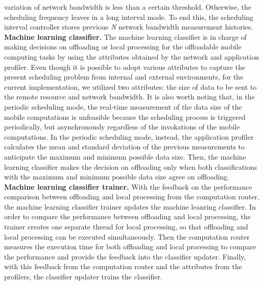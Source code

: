 \documentclass[10pt, conference, compsocconf]{IEEEtran}
\begin{document}
variation of network bandwidth is less than a certain threshold.
%
Otherwise, the scheduling frequency leaves in a long interval mode.
%
To end this, the scheduling interval controller stores previous
\textit{N} network bandwidth measurement histories.\\
%
\textbf{Machine learning classifier.} The machine learning classifier is
in charge of making decisions on offloading or local processing for the
offloadable mobile computing tasks by using the attributes obtained by
the network and application profiler.
%
Even though it is possible to adopt various attributes to capture the
present scheduling problem from internal and external environments, for
the current implementation, we utilized two attributes: the size of data
to be sent to the remote resource and network bandwidth.
%
It is also worth noting that, in the periodic scheduling mode, the
real-time measurement of the data size of the mobile computations is
unfeasible because the scheduling process is triggered periodically, but
asynchronously regardless of the invokations of the mobile computations.
%
In the periodic scheduling mode, instead, the application profiler
calculates the mean and standard deviation of the previous measurements
to anticipate the maximum and minimum possible data size.
%
Then, the machine learning classifier makes the decision on offloading
only when both classifications with the maximum and minimum possible
data size agree on offloading.\\
%
\textbf{Machine learning classifier trainer.} With the feedback on the
performance comparison between offloading and local processing from the
computation router, the machine learning classifier trainer updates
the machine leanring classifier.
%
In order to compare the performance between offloading and local
processing, the trainer creates one separate thread for local
processing, so that offloading and local processing can be executed
simultaneously.
%
Then the computation router measures the execution time for both
offloading and local processing to compare the performance and provide
the feedback into the classifier updater.
%
Finally, with this feedback from the computation router and the
attributes from the profilers, the classifier updater trains the
classifier.
%
\end{document}
